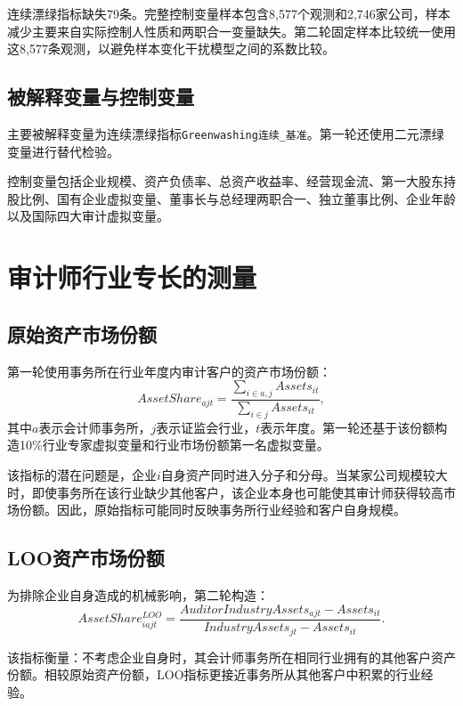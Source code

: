 \documentclass[12pt,a4paper]{article}
\begin{document}
连续漂绿指标缺失79条。完整控制变量样本包含8,577个观测和2,746家公司，样本减少主要来自实际控制人性质和两职合一变量缺失。第二轮固定样本比较统一使用这8,577条观测，以避免样本变化干扰模型之间的系数比较。

\subsection{被解释变量与控制变量}

主要被解释变量为连续漂绿指标\texttt{Greenwashing连续\_基准}。第一轮还使用二元漂绿变量进行替代检验。

控制变量包括企业规模、资产负债率、总资产收益率、经营现金流、第一大股东持股比例、国有企业虚拟变量、董事长与总经理两职合一、独立董事比例、企业年龄以及国际四大审计虚拟变量。

\section{审计师行业专长的测量}

\subsection{原始资产市场份额}

第一轮使用事务所在行业年度内审计客户的资产市场份额：
\begin{equation}
AssetShare_{ajt}=
\frac{\sum_{i\in a,j}Assets_{it}}
{\sum_{i\in j}Assets_{it}},
\end{equation}
其中$a$表示会计师事务所，$j$表示证监会行业，$t$表示年度。第一轮还基于该份额构造10\%行业专家虚拟变量和行业市场份额第一名虚拟变量。

该指标的潜在问题是，企业$i$自身资产同时进入分子和分母。当某家公司规模较大时，即使事务所在该行业缺少其他客户，该企业本身也可能使其审计师获得较高市场份额。因此，原始指标可能同时反映事务所行业经验和客户自身规模。

\subsection{LOO资产市场份额}

为排除企业自身造成的机械影响，第二轮构造：
\begin{equation}
AssetShare^{LOO}_{iajt}=
\frac{AuditorIndustryAssets_{ajt}-Assets_{it}}
{IndustryAssets_{jt}-Assets_{it}}.
\end{equation}

该指标衡量：不考虑企业自身时，其会计师事务所在相同行业拥有的其他客户资产份额。相较原始资产份额，LOO指标更接近事务所从其他客户中积累的行业经验。
\end{document}
